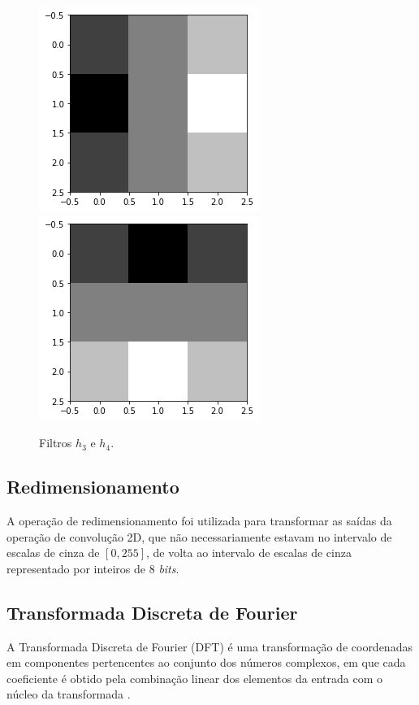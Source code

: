 \documentclass[twoside,twocolumn]{article}
\begin{document}
\begin{figure}[H]
\begin{center}
	\includegraphics[scale=.3]{figures/h3.png}
	\includegraphics[scale=.3]{figures/h4.png}
\caption{Filtros $h_{3}$ e $h_{4}$.} \label{gdimotes}
\end{center}
\end{figure}

\subsection{Redimensionamento}

A operação de redimensionamento foi utilizada para transformar as saídas da operação de convolução 2D, que não necessariamente estavam no intervalo de escalas de cinza de $\left[0,255\right]$, de volta ao intervalo de escalas de cinza representado por inteiros de 8 \textit{bits}.

\subsection{Transformada Discreta de Fourier}

A Transformada Discreta de Fourier (DFT) é uma transformação de coordenadas em componentes pertencentes ao conjunto dos números complexos, em que cada coeficiente é obtido pela combinação linear dos elementos da entrada com o núcleo da transformada \cite{b2}.
\end{document}
